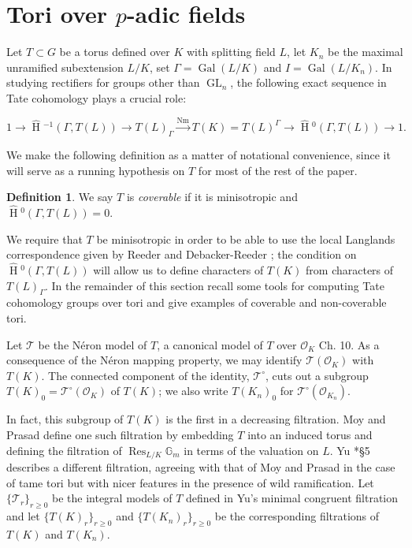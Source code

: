 \documentclass{compositio}
\theoremstyle{plain}
\newcommand{\HT}[1]{\hat{\HH}{}^{#1}}
\theoremstyle{definition}
\newtheorem{definition}[theorem]{Definition}
\numberwithin{equation}{section}
\DeclareMathOperator{\Gal}{Gal}
\DeclareMathOperator{\HH}{H}
\DeclareMathOperator{\Nm}{Nm}
\DeclareMathOperator{\Res}{Res}
\DeclareMathOperator{\GL}{GL}
\newcommand{\TT}{\mathcal{T}}
\newcommand{\OK}{\mathcal{O}_K}
\newcommand{\OKn}{\mathcal{O}_{K_n}}
\newcommand{\Gm}{\mathbb{G}_m}
\begin{document}
\section{Tori over $p$-adic fields} \label{section:padic_tori}

Let $T \subset G$ be a torus defined over $K$ with splitting field $L$, let $K_n$ be the maximal
unramified subextension $L/K$, set $\Gamma = \Gal(L/K)$ and $I = \Gal(L/K_n)$.
In studying rectifiers for groups other than $\GL_n$, the following exact sequence
in Tate cohomology plays a crucial role:

\begin{equation} \label{eq:tate4}
1 \rightarrow \HT{-1}(\Gamma,T(L)) \rightarrow T(L)_{\Gamma} \xrightarrow{\Nm} T(K)
  = T(L)^{\Gamma} \rightarrow \HT{0}(\Gamma,T(L)) \rightarrow 1.
\end{equation}

\noindent We make the following definition as a matter of notational convenience, since
it will serve as a running hypothesis on $T$ for most of the rest of the paper.

\begin{definition} \label{def:coverable}
We say $T$ is \emph{coverable} if it is minisotropic and $\HT{0}(\Gamma, T(L)) = 0$.
\end{definition}

We require that $T$ be minisotropic in order to be able to use the local Langlands correspondence
given by Reeder \cite{reeder:08a} and Debacker-Reeder \cite{reeder-debacker:09a}; the condition
on $\HT{0}(\Gamma, T(L))$ will allow us to define characters of $T(K)$ from characters of
$T(L)_\Gamma$.  In the remainder of this section recall some tools for computing Tate cohomology
groups over tori and give examples of coverable and non-coverable tori.

Let $\TT$ be the N\'eron model of $T$, a canonical model of $T$
over $\OK$ \cite{bosch-lutkebohmert-reynaud:NeronModels}{Ch. 10}.
As a consequence of the N\'eron mapping
property, we may identify $\TT(\OK)$ with $T(K)$.  The connected
component of the identity, $\TT^\circ$, cuts out a subgroup
$T(K)_0 = \TT^\circ(\OK)$ of $T(K)$; we also write $T(K_n)_0$ for
$\TT^\circ(\OKn)$.

In fact, this subgroup of $T(K)$ is the first in a decreasing filtration.
Moy and Prasad \cite{moy-prasad:96a}
define one such filtration by
embedding $T$ into an induced torus and defining the filtration of
$\Res_{L/K} \Gm$ in terms of the valuation on $L$.  Yu \cite{yu:03a}*{\S 5}
describes a different filtration, agreeing with that of Moy and Prasad
in the case of tame tori but with nicer features in the presence of wild
ramification.  Let $\{\TT_r\}_{r \ge 0}$ be the integral models of $T$ defined in Yu's
minimal congruent filtration and let $\{T(K)_r\}_{r \ge 0}$ and
$\{T(K_n)_r\}_{r \ge 0}$ be the corresponding filtrations of $T(K)$ and
$T(K_n)$.
\end{document}
